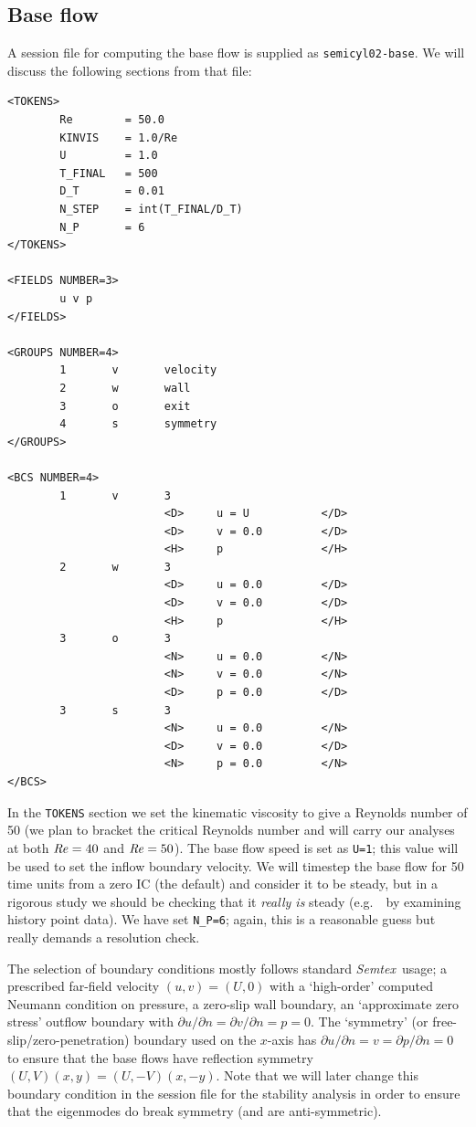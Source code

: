 \documentclass[11pt,a4paper]{report}
\newcommand\Rey{\mbox{\textit{Re}}}
\newcommand{\eg}{e.g.\ }
\newcommand{\Semtex}{\emph{Semtex}}
\begin{document}
\subsection{Base flow}

A session file for computing the base flow is supplied as
\verb+semicyl02-base+. We will discuss the following sections from
that file: {\small
\begin{verbatim}
<TOKENS>
        Re        = 50.0
        KINVIS    = 1.0/Re
        U         = 1.0
        T_FINAL   = 500
        D_T       = 0.01
        N_STEP    = int(T_FINAL/D_T)
        N_P       = 6
</TOKENS>

<FIELDS NUMBER=3>
        u v p
</FIELDS>

<GROUPS NUMBER=4>
        1       v       velocity
        2       w       wall
        3       o       exit
        4       s       symmetry
</GROUPS>

<BCS NUMBER=4>
        1       v       3
                        <D>     u = U           </D>
                        <D>     v = 0.0         </D>
                        <H>     p               </H>
        2       w       3
                        <D>     u = 0.0         </D>
                        <D>     v = 0.0         </D>
                        <H>     p               </H>
        3       o       3
                        <N>     u = 0.0         </N>
                        <N>     v = 0.0         </N>
                        <D>     p = 0.0         </D>
        3       s       3
                        <N>     u = 0.0         </N>
                        <D>     v = 0.0         </D>
                        <N>     p = 0.0         </N>
</BCS>
\end{verbatim}
} In the \verb+TOKENS+ section we set the kinematic viscosity to give
a Reynolds number of 50 (we plan to bracket the critical Reynolds
number and will carry our analyses at both $\Rey=40$ and $\Rey=50$).
The base flow speed is set as \verb+U=1+; this value will be used to
set the inflow boundary velocity.  We will timestep the base flow for
50 time units from a zero IC (the default) and consider it to be
steady, but in a rigorous study we should be checking that it
\emph{really is} steady (\eg\ by examining history point data). We
have set \verb+N_P=6+; again, this is a reasonable guess but really
demands a resolution check.

The selection of boundary conditions mostly follows standard
\Semtex\ usage; a prescribed far-field velocity $(u,v)=(U,0)$ with a
`high-order' computed Neumann condition on pressure, a zero-slip wall
boundary, an `approximate zero stress' outflow boundary with $\partial
u/\partial n=\partial v/\partial n = p = 0$.  The `symmetry' (or
free-slip/zero-penetration) boundary used on the $x$-axis has
$\partial u/\partial n=v=\partial p/\partial n=0$ to ensure that the
base flows have reflection symmetry $(U,V)(x,y)=(U,-V)(x,-y)$.  Note
that we will later change this boundary condition in the session file
for the stability analysis in order to ensure that the eigenmodes do
break symmetry (and are anti-symmetric).
\end{document}
